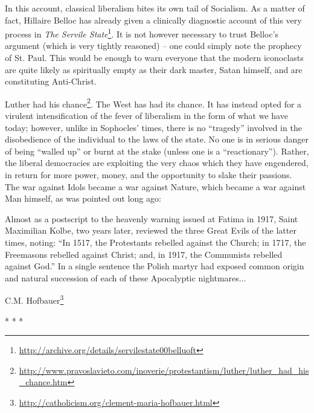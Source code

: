 In this account, classical liberalism bites its own tail of Socialism. As a matter of fact, Hillaire Belloc has already given a clinically diagnostic account of this very process in \emph{The Servile State}\footnote{\url{http://archive.org/details/servilestate00belluoft}}. It is not however necessary to trust Belloc's argument (which is very tightly reasoned) -- one could simply note the prophecy of St. Paul. This would be enough to warn everyone that the modern iconoclasts are quite likely as spiritually empty as their dark master, Satan himself, and are constituting Anti-Christ.

Luther had his chance\footnote{\url{http://www.pravoslavieto.com/inoverie/protestantism/luther/luther\_had\_his\_chance.htm}}. The West has had its chance. It has instead opted for a virulent intensification of the fever of liberalism in the form of what we have today; however, unlike in Sophocles' times, there is no ``tragedy'' involved in the disobedience of the individual to the laws of the state. No one is in serious danger of being ``walled up'' or burnt at the stake (unless one is a ``reactionary''). Rather, the liberal democracies are exploiting the very chaos which they have engendered, in return for more power, money, and the opportunity to slake their passions. The war against Idols became a war against Nature, which became a war against Man himself, as was pointed out long ago:

\begin{quotex}
Almost as a postscript to the heavenly warning issued at Fatima in 1917, Saint Maximilian Kolbe, two years later, reviewed the three Great Evils of the latter times, noting: ``In 1517, the Protestants rebelled against the Church; in 1717, the Freemasons rebelled against Christ; and, in 1917, the Communists rebelled against God.'' In a single sentence the Polish martyr had exposed common origin and natural succession of each of these Apocalyptic nightmares...
\end{quotex}


C.M. Hofbauer\footnote{\url{http://catholicism.org/clement-maria-hofbauer.html}}



\begin{center}* * *\end{center}

